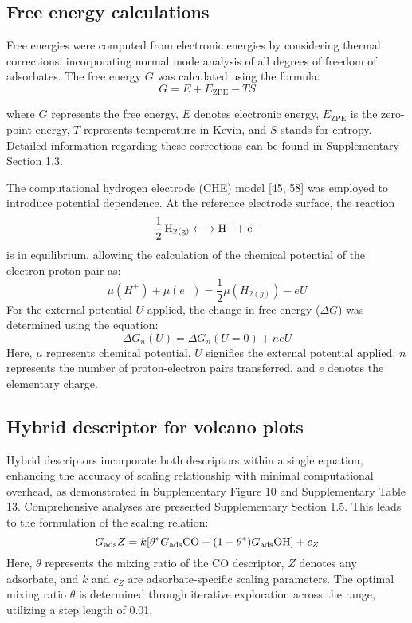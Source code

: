 \subsection{Free energy calculations}
Free energies were computed from electronic energies by considering thermal corrections, incorporating normal mode analysis of all degrees of freedom of adsorbates.
The free energy $\textit{G}$ was calculated using the formula:
\begin{equation*}
G = E + E_{\text{ZPE}} - TS
\end{equation*}

where $\textit{G}$ represents the free energy, $\textit{E}$ denotes electronic energy, $\textit{E}_{\text{ZPE}}$ is the zero-point energy, $\textit{T}$ represents temperature in Kevin, and $\textit{S}$ stands for entropy.
Detailed information regarding these corrections can be found in Supplementary Section 1.3.

The computational hydrogen electrode (CHE) model [45, 58] was employed to introduce potential dependence.
At the reference electrode surface, the reaction
\begin{equation*}
\ce{1/2H2_{(g)}  <-> H+ + e-}
\end{equation*}
is in equilibrium, allowing the calculation of the chemical potential of the electron-proton pair as:
\begin{equation*}
\mu(H^+) + \mu(e^-) = \frac{1}{2}\mu(H_{2(g)}) - eU
\end{equation*}
For the external potential $\textit{U}$ applied, the change in free energy ($\Delta \textit{G}$) was determined using the equation:
\begin{equation*}
\Delta G_n(U) = \Delta G_n(U=0) + neU
\end{equation*}
Here, $\mu$ represents chemical potential, $\textit{U}$ signifies the external potential applied, $\textit{n}$ represents the number of proton-electron pairs transferred, and $\textit{e}$ denotes the elementary charge.


\subsection{Hybrid descriptor for volcano plots}
Hybrid descriptors incorporate both descriptors within a single equation, enhancing the accuracy of scaling relationship with minimal computational overhead, as demonstrated in Supplementary Figure 10 and Supplementary Table 13.
Comprehensive analyses are presented Supplementary Section 1.5. This leads to the formulation of the scaling relation:
\begin{equation*}
G_{\text{ads}} Z = k[\theta^* G_{\text{ads}} \ce{CO} + (1-\theta^*) G_{\text{ads}} \ce{OH}] + c_Z
\end{equation*}
Here, $\theta$ represents the mixing ratio of the CO descriptor, $\textit{Z}$ denotes any adsorbate, and $\textit{k}$ and $\textit{c}_{Z}$ are adsorbate-specific scaling parameters.
The optimal mixing ratio $\theta$ is determined through iterative exploration across the range, utilizing a step length of 0.01.

